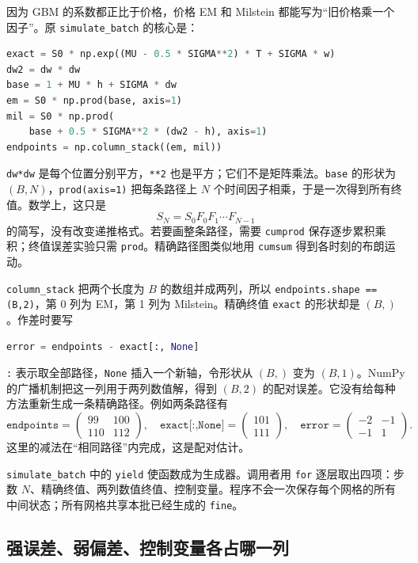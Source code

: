 \documentclass[11pt,a4paper,fontset=none]{ctexart}
\numberwithin{equation}{section}
\begin{document}
因为 GBM 的系数都正比于价格，价格 EM 和 Milstein 都能写为“旧价格乘一个因子”。原 \texttt{simulate\_batch} 的核心是：
\begin{lstlisting}[language=Python]
exact = S0 * np.exp((MU - 0.5 * SIGMA**2) * T + SIGMA * w)
dw2 = dw * dw
base = 1 + MU * h + SIGMA * dw
em = S0 * np.prod(base, axis=1)
mil = S0 * np.prod(
    base + 0.5 * SIGMA**2 * (dw2 - h), axis=1)
endpoints = np.column_stack((em, mil))
\end{lstlisting}
\texttt{dw*dw} 是每个位置分别平方，\texttt{**2} 也是平方；它们不是矩阵乘法。\texttt{base} 的形状为 $(B,N)$，\texttt{prod(axis=1)} 把每条路径上 $N$ 个时间因子相乘，于是一次得到所有终值。数学上，这只是
\[
S_N=S_0F_0F_1\cdots F_{N-1}
\]
的简写，没有改变递推格式。若要画整条路径，需要 \texttt{cumprod} 保存逐步累积乘积；终值误差实验只需 \texttt{prod}。精确路径图类似地用 \texttt{cumsum} 得到各时刻的布朗运动。

\texttt{column\_stack} 把两个长度为 $B$ 的数组并成两列，所以 \texttt{endpoints.shape == (B,2)}，第 0 列为 EM，第 1 列为 Milstein。精确终值 \texttt{exact} 的形状却是 $(B,)$。作差时要写
\begin{lstlisting}[language=Python]
error = endpoints - exact[:, None]
\end{lstlisting}
\texttt{:} 表示取全部路径，\texttt{None} 插入一个新轴，令形状从 $(B,)$ 变为 $(B,1)$。NumPy 的广播机制把这一列用于两列数值解，得到 $(B,2)$ 的配对误差。它没有给每种方法重新生成一条精确路径。例如两条路径有
\[
\texttt{endpoints}=\begin{pmatrix}99&100\\110&112\end{pmatrix},
\quad \texttt{exact[:,None]}=\begin{pmatrix}101\\111\end{pmatrix},
\quad \texttt{error}=\begin{pmatrix}-2&-1\\-1&1\end{pmatrix}.
\]
这里的减法在“相同路径”内完成，这是配对估计。

\texttt{simulate\_batch} 中的 \texttt{yield} 使函数成为生成器。调用者用 \texttt{for} 逐层取出四项：步数 $N$、精确终值、两列数值终值、控制变量。程序不会一次保存每个网格的所有中间状态；所有网格共享本批已经生成的 \texttt{fine}。

\subsection{强误差、弱偏差、控制变量各占哪一列}
\end{document}
